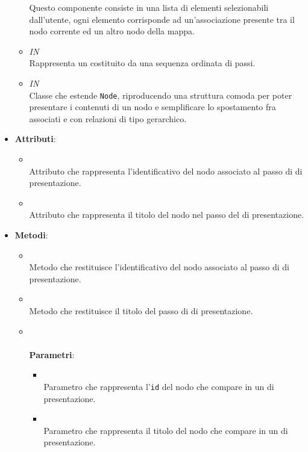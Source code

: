\begin{itemize}
\begin{itemize}
Questo componente consiste in una lista di elementi selezionabili dall’utente, ogni elemento corrisponde ad un'associazione presente tra il nodo corrente ed un altro nodo della mappa.
\item \textit{IN} \hyperref[\nogloxy{Premi::Front-End::Model::Path}]{}\\
Rappresenta un  costituito da una sequenza ordinata di passi.
\item \textit{IN} \hyperref[\nogloxy{Premi::Front-End::Model::PresentationNode}]{}\\
Classe che estende \texttt{Node}, riproducendo una struttura comoda per poter presentare i contenuti di un nodo e semplificare lo spostamento fra  associati e con relazioni di tipo gerarchico.
\end{itemize}
\item \textbf{Attributi}:
\begin{itemize}
\item {}
\\ Attributo che rappresenta l'identificativo del nodo associato al passo di  di presentazione.
\item {}
\\ Attributo che rappresenta il titolo del nodo nel passo del  di presentazione.
\end{itemize}
\item \textbf{Metodi}:
\begin{itemize}
\item {}
\\ Metodo che restituisce l'identificativo del nodo associato al passo di  di presentazione.
\item {}
\\ Metodo che restituisce il titolo del passo di  di presentazione.
\item {}
\\ \dpConstructor
\\ \textbf{Parametri}:
\begin{itemize}
\item {}
\\ Parametro che rappresenta l'\texttt{id} del nodo che compare in un  di presentazione.
\item {}
\\ Parametro che rappresenta il titolo del nodo che compare in un  di presentazione.
\end{itemize}
\end{itemize}
\end{itemize}
